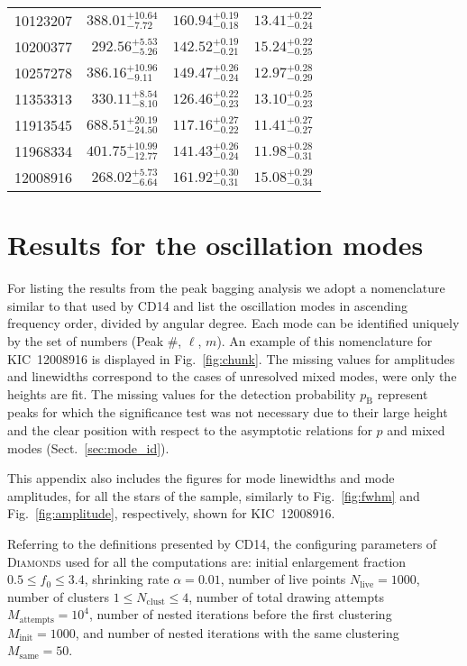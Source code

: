 \documentclass[structabstract]{aa}
\newcommand{\diamonds}{\textsc{D\large{iamonds}}}
\newcommand{\kic}{KIC~12008916}
\begin{document}
\begin{table*}
\begin{tabular}{l r c c}
10123207         & $388.01_{-7.72}^{+10.64}$   &   $160.94_{-0.18}^{+0.19}$   &   $13.41_{-0.24}^{+0.22}$ \\[1pt]
10200377         & $292.56_{-5.26}^{+5.53}$   &   $142.52_{-0.21}^{+0.19}$   &   $15.24_{-0.25}^{+0.22}$ \\[1pt]
10257278         & $386.16_{-9.11}^{+10.96}$   &   $149.47_{-0.24}^{+0.26}$   &   $12.97_{-0.29}^{+0.28}$ \\[1pt]
11353313         & $330.11_{-8.10}^{+8.54}$   &   $126.46_{-0.23}^{+0.22}$   &   $13.10_{-0.23}^{+0.25}$ \\[1pt]
11913545         & $688.51_{-24.50}^{+20.19}$   &   $117.16_{-0.22}^{+0.27}$   &   $11.41_{-0.27}^{+0.27}$ \\[1pt]
11968334         & $401.75_{-12.77}^{+10.99}$   &   $141.43_{-0.24}^{+0.26}$   &   $11.98_{-0.31}^{+0.28}$ \\[1pt]
12008916         & $268.02_{-6.64}^{+5.73}$   &   $161.92_{-0.31}^{+0.30}$   &   $15.08_{-0.34}^{+0.29}$ \\[1pt]
\hline
\end{tabular}
\label{tab:bkg2}
\end{table*}

\section{Results for the oscillation modes}
\label{sec:pb_results}
For listing the results from the peak bagging analysis we adopt a nomenclature similar to that used by CD14 and list the oscillation modes in ascending frequency order, divided by angular degree. Each mode can be identified uniquely by the set of numbers (Peak \#, $\ell$, $m$). An example of this nomenclature for \kic\,\,is displayed in Fig.~\ref{fig:chunk}. The missing values for amplitudes and linewidths correspond to the cases of unresolved mixed modes, were only the heights are fit. The missing values for the detection probability $p_\mathrm{B}$ represent peaks for which the significance test was not necessary due to their large height and the clear position with respect to the asymptotic relations for $p$ and mixed modes (Sect.~\ref{sec:mode_id}). 

This appendix also includes the figures for mode linewidths and mode amplitudes, for all the stars of the sample, similarly to Fig.~\ref{fig:fwhm} and Fig.~\ref{fig:amplitude}, respectively, shown for \kic.

Referring to the definitions presented by CD14, the configuring parameters of \diamonds\,\,used for all the computations are: initial enlargement fraction $0.5 \leq f_0 \leq 3.4$, shrinking rate $\alpha = 0.01$, number of live points $N_\mathrm{live} = 1000$, number of clusters $1 \leq N_\mathrm{clust} \leq 4$, number of total drawing attempts $M_\mathrm{attempts} = 10^4$, number of nested iterations before the first clustering $M_\mathrm{init} = 1000$, and number of nested iterations with the same clustering $M_\mathrm{same} = 50$.
\end{document}
